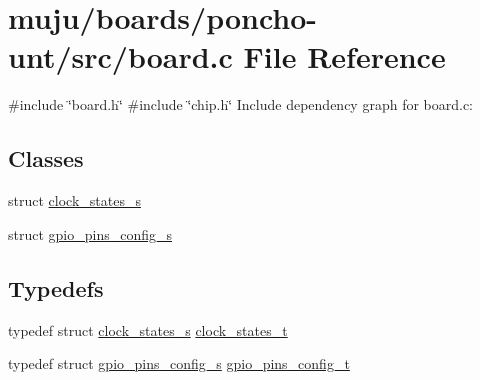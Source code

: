\hypertarget{poncho-unt_2src_2board_8c}{}\section{muju/boards/poncho-\/unt/src/board.c File Reference}
\label{poncho-unt_2src_2board_8c}
{\ttfamily \#include \char`\"{}board.\+h\char`\"{}}\newline
{\ttfamily \#include \char`\"{}chip.\+h\char`\"{}}\newline
Include dependency graph for board.\+c\+:
\subsection*{Classes}
\begin{DoxyCompactItemize}
\item 
struct \hyperlink{structclock__states__s}{clock\+\_\+states\+\_\+s}
\item 
struct \hyperlink{structgpio__pins__config__s}{gpio\+\_\+pins\+\_\+config\+\_\+s}
\end{DoxyCompactItemize}
\subsection*{Typedefs}
\begin{DoxyCompactItemize}
\item 
typedef struct \hyperlink{structclock__states__s}{clock\+\_\+states\+\_\+s} \hyperlink{group__hal_gaae8d32ee89693684379856530d8a1241}{clock\+\_\+states\+\_\+t}
\item 
typedef struct \hyperlink{structgpio__pins__config__s}{gpio\+\_\+pins\+\_\+config\+\_\+s} \hyperlink{group__hal_ga7eca1221f3682873bc58bc23f56ab861}{gpio\+\_\+pins\+\_\+config\+\_\+t}
\end{DoxyCompactItemize}
